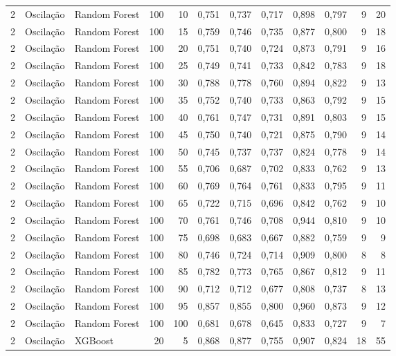 \begin{longtable}{@{}rllrrrrrrrrr@{}}
2 & Oscilação & Random Forest & 100 & 10 & 0,751 & 0,737 & 0,717 & 0,898 & 0,797 & 9 & 20 \\
2 & Oscilação & Random Forest & 100 & 15 & 0,759 & 0,746 & 0,735 & 0,877 & 0,800 & 9 & 18 \\
2 & Oscilação & Random Forest & 100 & 20 & 0,751 & 0,740 & 0,724 & 0,873 & 0,791 & 9 & 16 \\
2 & Oscilação & Random Forest & 100 & 25 & 0,749 & 0,741 & 0,733 & 0,842 & 0,783 & 9 & 18 \\
2 & Oscilação & Random Forest & 100 & 30 & 0,788 & 0,778 & 0,760 & 0,894 & 0,822 & 9 & 13 \\
2 & Oscilação & Random Forest & 100 & 35 & 0,752 & 0,740 & 0,733 & 0,863 & 0,792 & 9 & 15 \\
2 & Oscilação & Random Forest & 100 & 40 & 0,761 & 0,747 & 0,731 & 0,891 & 0,803 & 9 & 15 \\
2 & Oscilação & Random Forest & 100 & 45 & 0,750 & 0,740 & 0,721 & 0,875 & 0,790 & 9 & 14 \\
2 & Oscilação & Random Forest & 100 & 50 & 0,745 & 0,737 & 0,737 & 0,824 & 0,778 & 9 & 14 \\
2 & Oscilação & Random Forest & 100 & 55 & 0,706 & 0,687 & 0,702 & 0,833 & 0,762 & 9 & 13 \\
2 & Oscilação & Random Forest & 100 & 60 & 0,769 & 0,764 & 0,761 & 0,833 & 0,795 & 9 & 11 \\
2 & Oscilação & Random Forest & 100 & 65 & 0,722 & 0,715 & 0,696 & 0,842 & 0,762 & 9 & 10 \\
2 & Oscilação & Random Forest & 100 & 70 & 0,761 & 0,746 & 0,708 & 0,944 & 0,810 & 9 & 10 \\
2 & Oscilação & Random Forest & 100 & 75 & 0,698 & 0,683 & 0,667 & 0,882 & 0,759 & 9 & 9 \\
2 & Oscilação & Random Forest & 100 & 80 & 0,746 & 0,724 & 0,714 & 0,909 & 0,800 & 8 & 8 \\
2 & Oscilação & Random Forest & 100 & 85 & 0,782 & 0,773 & 0,765 & 0,867 & 0,812 & 9 & 11 \\
2 & Oscilação & Random Forest & 100 & 90 & 0,712 & 0,712 & 0,677 & 0,808 & 0,737 & 8 & 13 \\
2 & Oscilação & Random Forest & 100 & 95 & 0,857 & 0,855 & 0,800 & 0,960 & 0,873 & 9 & 12 \\
2 & Oscilação & Random Forest & 100 & 100 & 0,681 & 0,678 & 0,645 & 0,833 & 0,727 & 9 & 7 \\
2 & Oscilação & XGBoost & 20 & 5 & 0,868 & 0,877 & 0,755 & 0,907 & 0,824 & 18 & 55 \\

\end{longtable}
